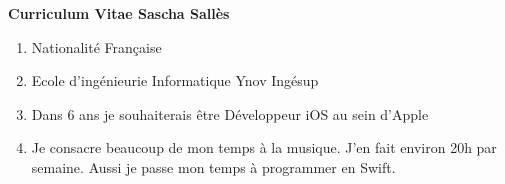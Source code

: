 \documentclass[12pt]{article}
\begin{document}
	\textbf{\Large Curriculum Vitae Sascha Sallès} 
	\begin{enumerate}
		\item Nationalité Française
		\item Ecole d'ingénieurie Informatique Ynov Ingésup
		\item Dans 6 ans je souhaiterais être Développeur iOS au sein d'Apple
		\item Je consacre beaucoup de mon temps à la musique. J'en fait environ 20h par semaine.
		Aussi je passe mon temps à programmer en Swift.
	\end{enumerate}
\end{document}
